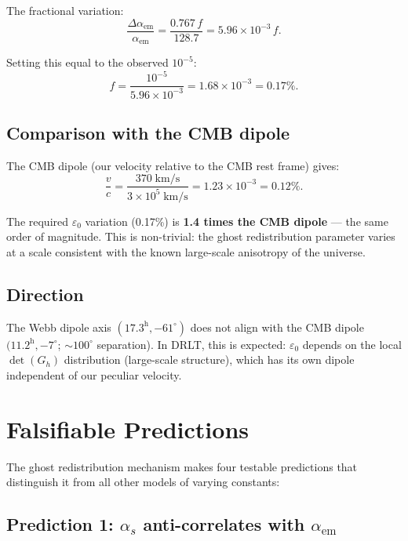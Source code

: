 \documentclass[12pt]{article}
\theoremstyle{remark}
\begin{document}
The fractional variation:
\begin{equation}
\frac{\Delta\alpha_\text{em}}{\alpha_\text{em}} = \frac{0.767\,f}{128.7} = 5.96 \times 10^{-3}\,f.
\end{equation}

Setting this equal to the observed $10^{-5}$:
\begin{equation}
\boxed{f = \frac{10^{-5}}{5.96 \times 10^{-3}} = 1.68 \times 10^{-3} = 0.17\%.}
\end{equation}

\subsection{Comparison with the CMB dipole}

The CMB dipole (our velocity relative to the CMB rest frame) gives:
\begin{equation}
\frac{v}{c} = \frac{370\;\text{km/s}}{3 \times 10^5\;\text{km/s}} = 1.23 \times 10^{-3} = 0.12\%.
\end{equation}

The required $\varepsilon_0$ variation (0.17\%) is \textbf{1.4 times the CMB dipole} --- the same order of magnitude. This is non-trivial: the ghost redistribution parameter varies at a scale consistent with the known large-scale anisotropy of the universe.

\subsection{Direction}

The Webb dipole axis $(17.3^\text{h}, -61^\circ)$ does not align with the CMB dipole $(11.2^\text{h}, -7^\circ$; $\sim 100^\circ$ separation). In DRLT, this is expected: $\varepsilon_0$ depends on the local $\det(G_h)$ distribution (large-scale structure), which has its own dipole independent of our peculiar velocity.

\section{Falsifiable Predictions}

The ghost redistribution mechanism makes four testable predictions that distinguish it from all other models of varying constants:

\subsection{Prediction 1: $\alpha_s$ anti-correlates with $\alpha_\text{em}$}
\end{document}
